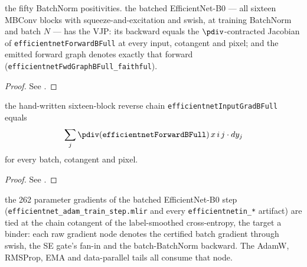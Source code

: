 \begin{theorem}
  \label{thm:efficientnetFullHasVJP}
  \leanok
  \Assume{} the fifty BatchNorm positivities. \Prove{} the batched
  EfficientNet-B0 --- all sixteen MBConv blocks with squeeze-and-excitation
  and swish, at training BatchNorm and batch \(N\) --- has the VJP: its
  backward equals the \(\pdiv\)-contracted Jacobian of
  \texttt{efficientnetForwardBFull} at every input, cotangent and pixel;
  and the emitted forward graph denotes exactly that forward
  (\texttt{efficientnetFwdGraphBFull\_faithful}).
\end{theorem}

\begin{proof}
\leanok
See .
\end{proof}

\begin{theorem}
  \label{thm:efficientnet_whole_back}
  \leanok
  \Prove{} the hand-written sixteen-block reverse chain
  \texttt{efficientnetInputGradBFull} equals
  \[
    \sum_j \pdiv(\texttt{efficientnetForwardBFull})\, x\, i\, j \cdot dy_j
  \]
  for every batch, cotangent and pixel.
\end{theorem}

\begin{proof}
\leanok
See .
\end{proof}

\begin{theorem}
  \label{thm:efficientnet_step_tie}
  \leanok
  \Prove{} the 262 parameter gradients of the batched EfficientNet-B0 step
  (\texttt{efficientnet\_adam\_train\_step.mlir} and every
  \texttt{efficientnetin\_*} artifact) are tied at the chain cotangent of the
  label-smoothed cross-entropy, the target a binder: each raw gradient node
  denotes the certified batch gradient through swish, the SE gate's fan-in
  and the batch-BatchNorm backward. The AdamW, RMSProp, EMA and
  data-parallel tails all consume that node.
\end{theorem}


